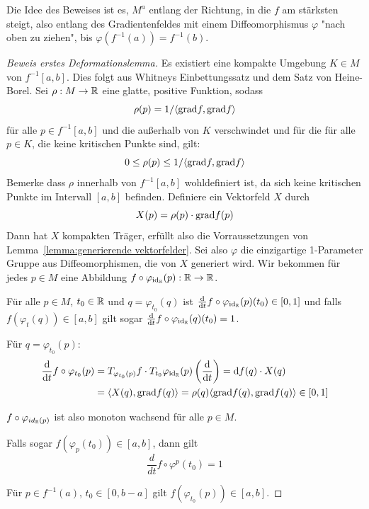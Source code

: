 Die Idee des Beweises ist es, $M^a$ entlang der Richtung, in die $f$ am stärksten
steigt, also entlang des Gradientenfeldes mit einem Diffeomorphismus $\varphi$ 
"nach oben zu ziehen", bis $\varphi(f^{-1}(a)) = f^{-1}(b)$.

\begin{proof}[Beweis erstes Deformationslemma]
    Es existiert eine kompakte Umgebung $K \in M$ von $f^{-1}[a, b]$. Dies folgt
    aus Whitneys Einbettungssatz und dem Satz von Heine-Borel.
    Sei $\rho: M \to { \mathbb R }$ eine glatte, positive Funktion, sodass
    \[ \rho(p) = 1 / \langle { \operatorname{grad} } f, { \operatorname{grad} } f \rangle \]
    für alle $p \in f^{-1}[a, b]$ und die außerhalb von $K$ verschwindet und für
    die für alle $p \in K$, die keine kritischen Punkte sind, gilt: 
    \[ 0 \leq \rho(p) \leq 1 / \langle { \operatorname{grad} } f, { \operatorname{grad} } f \rangle \]
    Bemerke dass $\rho$ innerhalb von $f^{-1}[a, b]$ wohldefiniert 
    ist, da sich keine kritischen Punkte im Intervall $[a, b]$ befinden. 
    Definiere ein Vektorfeld $X$ durch
    \[ X(p) = \rho(p) \cdot { \operatorname{grad} } f (p) \]
    Dann hat $X$ kompakten Träger, erfüllt also die Vorraussetzungen von 
    Lemma~\ref{lemma:generierende vektorfelder}. Sei also $\varphi$ die
    einzigartige 1-Parameter Gruppe aus Diffeomorphismen, die von $X$ generiert
    wird. 
    Wir bekommen für jedes $p \in M$ eine Abbildung 
    $f \circ \varphi_{{ \operatorname{id} }_{{ \mathbb R }}}(p): { \mathbb R } \to { \mathbb R }$.
    
     Für alle $p \in M$, $t_0 \in { \mathbb R }$ und $q = \varphi_{t_0}(q)$
    ist ${ \frac{{ \operatorname{d} } }{{ \operatorname{d} } t} } f \circ \varphi_{{ \operatorname{id} }_{{ \mathbb R }}}(p) (t_0) \in [0, 1]$ und falls $f(\varphi_t(q)) \in [a, b]$
    gilt sogar ${ \frac{{ \operatorname{d} } }{{ \operatorname{d} } t} } f \circ \varphi_{{ \operatorname{id} }_{{ \mathbb R }}}(q) (t_0) = 1$.

    Für $q = \varphi_{t_0}(p)$:
    \begin{align*}
        { \frac{{ \operatorname{d} }}{{ \operatorname{d} }t} } f \circ \varphi_{t_0}(p)
        & = T_{\varphi_{t_0}(p)} f \cdot T_{t_0}\varphi_{{ \operatorname{id} }_{{ \mathbb R }}}(p) \left( { \frac{{ \operatorname{d} } }{{ \operatorname{d} } t} } \right)
        = { \operatorname{d} } f (q) \cdot X(q) \\
        & = \langle X(q), { \operatorname{grad} } f (q) \rangle 
        = \rho(q) \langle { \operatorname{grad} } f (q), { \operatorname{grad} } f (q) \rangle \in [0, 1]
    \end{align*}
    
    $f \circ \varphi_{id_{{ \mathbb R }}(p)}$ ist also monoton wachsend für alle $p \in M$.

    Falls sogar $f(\varphi_p(t_0)) \in [a, b]$, dann gilt
    \[ \frac{d}{dt} f \circ \varphi^p (t_0) = 1 \]
    \sectiondone

     Für $p \in f^{-1}(a)$, $t_0 \in [0, b-a]$ gilt $f(\varphi_{t_0}(p)) \in [a, b]$.
    

\end{proof}
